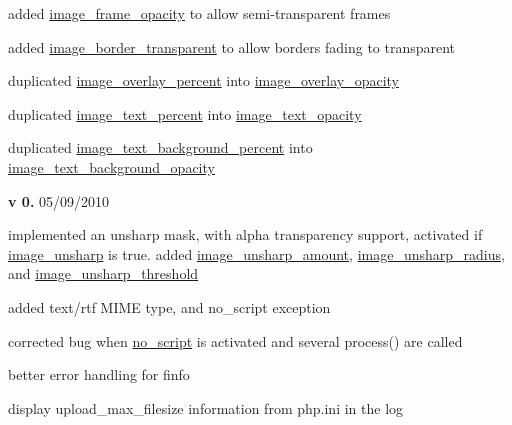 \begin{DoxyItemize}
\begin{DoxyItemize}
\item added \hyperlink{}{image\+\_\+frame\+\_\+opacity} to allow semi-\/transparent frames~\newline

\item added \hyperlink{}{image\+\_\+border\+\_\+transparent} to allow borders fading to transparent~\newline

\item duplicated \hyperlink{}{image\+\_\+overlay\+\_\+percent} into \hyperlink{}{image\+\_\+overlay\+\_\+opacity}~\newline

\item duplicated \hyperlink{}{image\+\_\+text\+\_\+percent} into \hyperlink{}{image\+\_\+text\+\_\+opacity}~\newline

\item duplicated \hyperlink{}{image\+\_\+text\+\_\+background\+\_\+percent} into \hyperlink{}{image\+\_\+text\+\_\+background\+\_\+opacity} 
\end{DoxyItemize}
\item {\bfseries v 0.} 05/09/2010~\newline

\begin{DoxyItemize}
\item implemented an unsharp mask, with alpha transparency support, activated if \hyperlink{}{image\+\_\+unsharp} is true. added \hyperlink{}{image\+\_\+unsharp\+\_\+amount}, \hyperlink{}{image\+\_\+unsharp\+\_\+radius}, and \hyperlink{}{image\+\_\+unsharp\+\_\+threshold}~\newline

\item added text/rtf M\+I\+M\+E type, and no\+\_\+script exception~\newline

\item corrected bug when \hyperlink{}{no\+\_\+script} is activated and several process() are called~\newline

\item better error handling for finfo~\newline

\item display upload\+\_\+max\+\_\+filesize information from php.\+ini in the log~\newline


\end{DoxyItemize}
\end{DoxyItemize}

